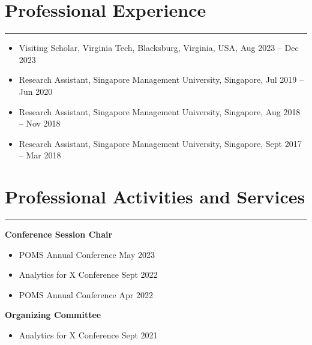 \documentclass[12pt, a4paper]{article}
\begin{document}
{\section*{Professional Experience}
\vspace*{0.4em}
\hrule height 0.5pt

\begin{itemize}[leftmargin=26pt, itemsep=0pt, parsep=0.2pt, topsep=1pt]
    \item Visiting Scholar, Virginia Tech, Blacksburg, Virginia, USA, Aug 2023 -- Dec 2023	
    \item Research Assistant, Singapore Management University, Singapore, Jul 2019 -- Jun 2020
	\item Research Assistant, Singapore Management University, Singapore, Aug 2018 -- Nov 2018
    \item Research Assistant, Singapore Management University, Singapore, Sept 2017 -- Mar 2018
\end{itemize}




\section*{Professional Activities and Services}
\vspace*{0.4em}
\hrule height 0.5pt

\raggedright\textbf{Conference Session Chair}

\begin{itemize}[leftmargin=26pt, itemsep=2pt, parsep=0pt, topsep=-0.5em]
	\item POMS Annual Conference \hfill May 2023
	\item Analytics for X Conference \hfill Sept 2022
	\item POMS Annual Conference \hfill Apr 2022
\end{itemize}



\raggedright\textbf{Organizing Committee}

\begin{itemize}[leftmargin=26pt, itemsep=2pt, parsep=0pt, topsep=-0.5em]
	\item Analytics for X Conference \hfill Sept 2021
\end{itemize}



}
\end{document}
